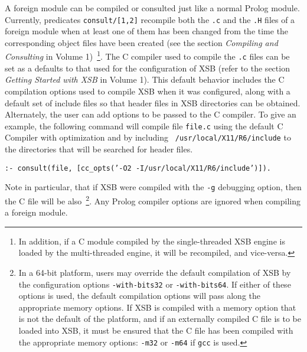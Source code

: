A foreign module can be compiled or consulted just like a normal
Prolog module.  Currently, predicates {\tt consult/[1,2]} recompile
both the {\tt *.c} and the {\tt *.H} files of a foreign module when at
least one of them has been changed from the time the corresponding
object files have been created (see the section {\it Compiling and
  Consulting} in Volume 1)~\footnote{In addition, if a C module
  compiled by the single-threaded XSB engine is loaded by the
  multi-threaded engine, it will be recompiled, and vice-versa.}.  The
C compiler used to compile the {\tt *.c} files can be set as a
defaults to that used for the configuration of XSB (refer to the
section {\it Getting Started with XSB} in Volume 1).  This default
behavior includes the C compilation options used to compile XSB when
it was configured, along with a default set of include files so that
header files in XSB directories can be obtained.  Alternately, the
user can add options to be passed to the C compiler.  To give an
example, the following command will compile file {\tt file.c} using
the default C Compiler with optimization and by including {\tt
  /usr/local/X11/R6/include} to the directories that will be searched
for header files.
\begin{center}
{\tt  :- consult(file, [cc\_opts('-O2 -I/usr/local/X11/R6/include')]). }
\end{center}
Note in particular, that if XSB were compiled with the {\tt -g}
debugging option, then the C file will be also~\footnote{ In a 64-bit
  platform, users may override the default compilation of XSB by the
  configuration options {\tt -with-bits32} or {\tt -with-bits64}.  If
  either of these options is used, the default compilation options
  will pass along the appropriate memory options.  If XSB is compiled
  with a memory option that is not the default of the platform, and if
  an externally compiled C file is to be loaded into XSB, it must be
  ensured that the C file has been compiled with the appropriate
  memory options: {\tt -m32} or {\tt -m64} if {\tt gcc} is used.}.
Any Prolog compiler options are ignored when compiling a foreign
module.

